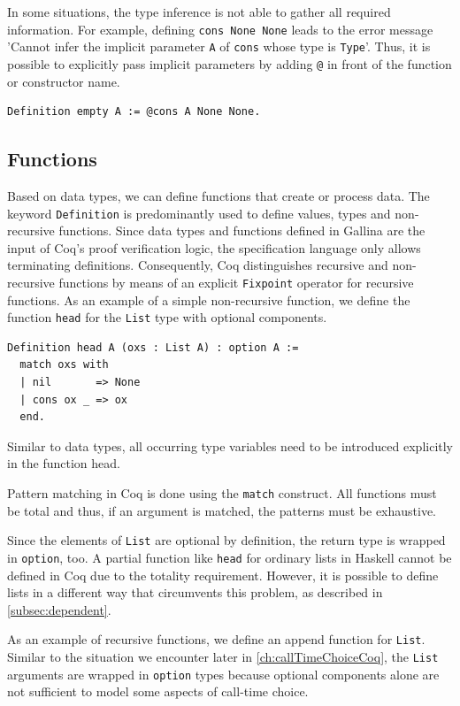 \documentclass[a4paper, 11pt, fleqn, twoside, abstract=on]{scrreprt}
\newcommand{\cinl}[1]{\texttt{#1}}
\begin{document}
In some situations, the type inference is not able to gather all required information.
For example, defining \cinl{cons None None} leads to the error message 'Cannot infer the implicit parameter \cinl{A} of \cinl{cons} whose type is \cinl{Type}'.
Thus, it is possible to explicitly pass implicit parameters by adding \cinl{@} in front of the function or constructor name.
\begin{verbatim}
Definition empty A := @cons A None None.
\end{verbatim}

\subsection{Functions}
\label{subsec:coqFunctions}

Based on data types, we can define functions that create or process data.
The keyword \cinl{Definition} is predominantly used to define values, types and non-recursive functions.
Since data types and functions defined in Gallina are the input of Coq's proof verification logic, the specification language only allows terminating definitions.
Consequently, Coq distinguishes recursive and non-recursive functions by means of an explicit \cinl{Fixpoint} operator for recursive functions.
As an example of a simple non-recursive function, we define the function \cinl{head} for the \cinl{List} type with optional components.

\begin{verbatim}
Definition head A (oxs : List A) : option A :=
  match oxs with
  | nil       => None
  | cons ox _ => ox
  end.
\end{verbatim}
\noindent
Similar to data types, all occurring type variables need to be introduced explicitly in the function head.

Pattern matching in Coq is done using the \cinl{match} construct.
All functions must be total and thus, if an argument is matched, the patterns must be exhaustive.

Since the elements of \cinl{List} are optional by definition, the return type is wrapped in \cinl{option}, too.
A partial function like \cinl{head} for ordinary lists in Haskell cannot be defined in Coq due to the totality requirement.
However, it is possible to define lists in a different way that circumvents this problem, as described in \autoref{subsec:dependent}.

As an example of recursive functions, we define an append function for \cinl{List}.
Similar to the situation we encounter later in \autoref{ch:callTimeChoiceCoq}, the \cinl{List} arguments are wrapped in \cinl{option} types because optional components alone are not sufficient to model some aspects of call-time choice.
\end{document}
